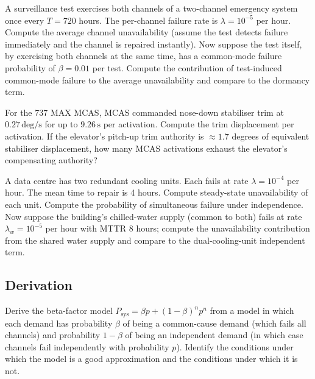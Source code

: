 \begin{exercise}
A surveillance test exercises both channels of a two-channel emergency system once every $T = 720$ hours. The per-channel failure rate is $\lambda = 10^{-5}$ per hour. Compute the average channel unavailability (assume the test detects failure immediately and the channel is repaired instantly). Now suppose the test itself, by exercising both channels at the same time, has a common-mode failure probability of $\beta = 0.01$ per test. Compute the contribution of test-induced common-mode failure to the average unavailability and compare to the dormancy term.
\end{exercise}

\begin{exercise}
For the 737 MAX MCAS, MCAS commanded nose-down stabiliser trim at $0.27\,\text{deg/s}$ for up to $9.26\,\text{s}$ per activation. Compute the trim displacement per activation. If the elevator's pitch-up trim authority is $\approx 1.7$ degrees of equivalent stabiliser displacement, how many MCAS activations exhaust the elevator's compensating authority?
\end{exercise}

\begin{exercise}
A data centre has two redundant cooling units. Each fails at rate $\lambda = 10^{-4}$ per hour. The mean time to repair is 4 hours. Compute steady-state unavailability of each unit. Compute the probability of simultaneous failure under independence. Now suppose the building's chilled-water supply (common to both) fails at rate $\lambda_w = 10^{-5}$ per hour with MTTR 8 hours; compute the unavailability contribution from the shared water supply and compare to the dual-cooling-unit independent term.
\end{exercise}

\subsection*{Derivation}

\begin{exercise}
Derive the beta-factor model $P_{\text{sys}} = \beta p + (1 - \beta)^n p^n$ from a model in which each demand has probability $\beta$ of being a common-cause demand (which fails all channels) and probability $1 - \beta$ of being an independent demand (in which case channels fail independently with probability $p$). Identify the conditions under which the model is a good approximation and the conditions under which it is not.
\end{exercise}


